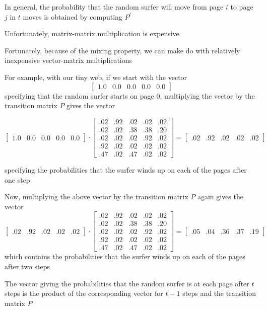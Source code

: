 \documentclass[8pt,a4paper,compress]{beamer}
\begin{document}
\begin{frame}[fragile]
\pause

In general, the probability that the random surfer will move from page $i$ to page $j$ in $t$ moves is obtained by computing $P^t$ 

\pause\bigskip 

Unfortunately, matrix-matrix multiplication is expensive

\pause\bigskip

Fortunately, because of the mixing property, we can make do with relatively inexpensive vector-matrix multiplications

\pause\bigskip

For example, with our tiny web, if we start with the vector 
\[
\begin{bmatrix}
1.0 & 0.0 & 0.0 & 0.0 & 0.0
\end{bmatrix}
\]
specifying that the random surfer starts on page 0, multiplying the vector by the transition matrix $P$ gives the vector 

\[
\begin{bmatrix}
1.0 & 0.0 & 0.0 & 0.0 & 0.0
\end{bmatrix}
\cdot
\begin{bmatrix}
.02 & .92 & .02 & .02 & .02 \\
.02 & .02 & .38 & .38 & .20 \\
.02 & .02 & .02 & .92 & .02 \\
.92 & .02 & .02 & .02 & .02 \\
.47 & .02 & .47 & .02 & .02
\end{bmatrix} = 
\begin{bmatrix}
.02 & .92 & .02 & .02 & .02
\end{bmatrix}
\]

specifying the probabilities that the surfer winds up on each of the pages after one step
\end{frame}

\begin{frame}[fragile]
\pause

Now, multiplying the above vector by the transition matrix $P$ again gives the vector
\[
\begin{bmatrix}
.02 & .92 & .02 & .02 & .02
\end{bmatrix}
\cdot
\begin{bmatrix}
.02 & .92 & .02 & .02 & .02 \\
.02 & .02 & .38 & .38 & .20 \\
.02 & .02 & .02 & .92 & .02 \\
.92 & .02 & .02 & .02 & .02 \\
.47 & .02 & .47 & .02 & .02
\end{bmatrix} =
\begin{bmatrix}
.05 & .04 & .36 & .37 & .19
\end{bmatrix}
\]
which contains the probabilities that the surfer winds up on each of the pages after two steps

\pause\bigskip

The vector giving the probabilities that the random surfer is at each page after $t$ steps is the product of the corresponding vector for $t-1$ steps and the transition matrix $P$
\end{frame}
\end{document}
